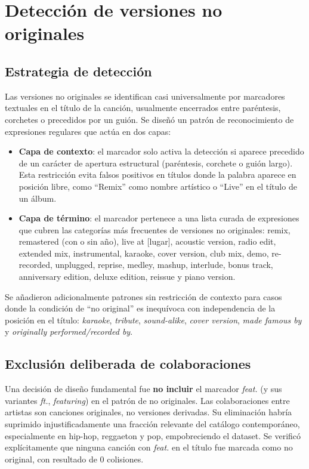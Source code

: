 \documentclass[12pt, a4paper]{book}
\theoremstyle{definition}
\begin{document}
\section{Detección de versiones no originales}
\label{sec:deteccion_no_originales}

\subsection{Estrategia de detección}

Las versiones no originales se identifican casi universalmente por marcadores
textuales en el título de la canción, usualmente encerrados entre paréntesis,
corchetes o precedidos por un guión. Se diseñó un patrón de reconocimiento
de expresiones regulares que actúa en dos capas:

\begin{itemize}
  \item \textbf{Capa de contexto}: el marcador solo activa la detección si
        aparece precedido de un carácter de apertura estructural (paréntesis,
        corchete o guión largo). Esta restricción evita falsos positivos en
        títulos donde la palabra aparece en posición libre, como ``Remix''
        como nombre artístico o ``Live'' en el título de un álbum.

  \item \textbf{Capa de término}: el marcador pertenece a una lista curada
        de expresiones que cubren las categorías más frecuentes de versiones
        no originales: remix, remastered (con o sin año), live at [lugar],
        acoustic version, radio edit, extended mix, instrumental, karaoke,
        cover version, club mix, demo, re-recorded, unplugged, reprise,
        medley, mashup, interlude, bonus track, anniversary edition, deluxe
        edition, reissue y piano version.
\end{itemize}

Se añadieron adicionalmente patrones sin restricción de contexto para casos
donde la condición de ``no original'' es inequívoca con independencia de la
posición en el título: \textit{karaoke}, \textit{tribute}, \textit{sound-alike},
\textit{cover version}, \textit{made famous by} y \textit{originally
performed/recorded by}.

\subsection{Exclusión deliberada de colaboraciones}

Una decisión de diseño fundamental fue \textbf{no incluir} el marcador
\textit{feat.} (y sus variantes \textit{ft.}, \textit{featuring}) en el
patrón de no originales. Las colaboraciones entre artistas son canciones
originales, no versiones derivadas. Su eliminación habría suprimido
injustificadamente una fracción relevante del catálogo contemporáneo,
especialmente en hip-hop, reggaeton y pop, empobreciendo el dataset. Se
verificó explícitamente que ninguna canción con \textit{feat.} en el título
fue marcada como no original, con resultado de 0 colisiones.
\end{document}
